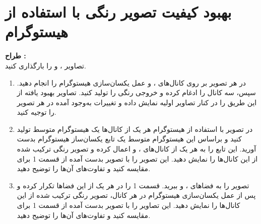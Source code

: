 \documentclass[a4paper]{article}
\begin{document}
\section{بهبود کیفیت تصویر رنگی با استفاده از هیستوگرام}
\textbf{طراح : }
\vspace{0.5cm}
\\
تصاویر 
،  
و 
را بارگذاری کنید.
\begin{enumerate}
	\item 
در هر تصویر بر روی کانال‌های 
،
و
عمل یکسان‌سازی هیستوگرام را انجام دهید. سپس، سه کانال را ادغام کرده و خروجی رنگی را تولید کنید. تصاویر بهبود یافته از این طریق را در کنار تصاویر اولیه نمایش داده و تغییرات به‌وجود آمده در هر تصویر را توجیه کنید.
	\item 
در تصویر
 با استفاده از هیستوگرام هر یک از کانال‌ها یک هیستوگرام متوسط تولید کنید و براساس این هیستوگرام متوسط یک تابع یکسان‌ساز هیستوگرام بدست آورید. این تابع را به هر یک از کانال‌های
،
و
 اعمال کرده و تصویر رنگی ترکیب شده از این کانال‌ها را نمایش دهید. این تصویر را با تصویر بدست آمده از قسمت 1 برای
  مقایسه کنید و تفاوت‌های آن‌ها را توضیح دهید.
  \item 
تصویر
 را به فضاهای 
 ، 
 و
 ببرید. قسمت 1 را در هر یک از این فضاها تکرار کرده و پس از عمل یکسان‌سازی هیستوگرام در هر کانال، تصویر رنگی ترکیب شده از این کانال‌ها را نمایش دهید. این تصاویر را با تصویر بدست آمده از قسمت 1 برای
 مقایسه کنید و تفاوت‌های آن‌ها را توضیح دهید.
  
\end{enumerate}
\end{document}
